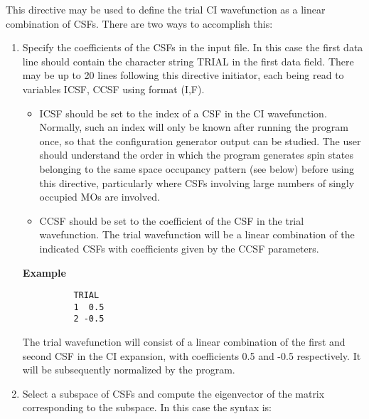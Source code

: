 \documentclass[11pt,fleqn]{article}
\begin{document}
This directive may be used to define the trial CI wavefunction as
a linear combination of CSFs. There are two ways to accomplish this:
\begin{enumerate}
\item Specify the coefficients of the CSFs in the input file. In this
case the first data line should contain the
character string TRIAL in the first data field.
There may be up to 20 lines following this directive initiator,
each being read to variables ICSF, CCSF using format (I,F).
\begin{itemize}
\item ICSF should be set to the index of a CSF in the
CI wavefunction. Normally, such an index will only be known
after running the program once, so that the configuration generator
output can be studied. The user should understand the order in which
the program generates spin states belonging to the same space occupancy
pattern (see below) before using this directive, particularly
where CSFs involving large numbers of singly occupied MOs are involved.
\item  CCSF should be set to the coefficient of the CSF in the trial
wavefunction. The trial wavefunction will be a linear combination of the
indicated CSFs with coefficients given by the CCSF parameters.
\end{itemize}

{\bf Example}
{
\footnotesize
\begin{verbatim}
          TRIAL
          1  0.5
          2 -0.5
\end{verbatim}
}

The trial wavefunction will consist of a linear combination of the first
and second CSF in the CI expansion, with coefficients 0.5 and -0.5
respectively. It will be subsequently normalized by the program.
 
\item Select a subspace of CSFs and compute the eigenvector of the
matrix corresponding to the subspace.  In this case the syntax is:


\end{enumerate}
\end{document}
